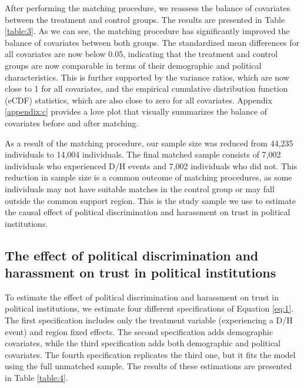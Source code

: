 \documentclass{article}
\begin{document}
After performing the matching procedure, we reassess the balance of covariates between the treatment and control groups. The results are presented in Table \ref{table:3}. As we can see, the matching procedure has significantly improved the balance of covariates between both groups. The standardized mean differences for all covariates are now below 0.05, indicating that the treatment and control groups are now comparable in terms of their demographic and political characteristics. This is further supported by the variance ratios, which are now close to 1 for all covariates, and the empirical cumulative distribution function (eCDF) statistics, which are also close to zero for all covariates. Appendix \ref{appendix:c} provides a love plot that visually summarizes the balance of covariates before and after matching.



As a result of the matching procedure, our sample size was reduced from 44,235 individuals to 14,004 individuals. The final matched sample consists of 7,002 individuals who experienced D/H events and 7,002 individuals who did not. This reduction in sample size is a common outcome of matching procedures, as some individuals may not have suitable matches in the control group or may fall outside the common support region. This is the study sample we use to estimate the causal effect of political discrimination and harassment on trust in political institutions.

\subsection{The effect of political discrimination and harassment on trust in political institutions}

To estimate the effect of political discrimination and harassment on trust in political institutions, we estimate four different specifications of Equation \ref{eq:1}. The first specification includes only the treatment variable (experiencing a D/H event) and region fixed effects. The second specification adds demographic covariates, while the third specification adds both demographic and political covariates. The fourth specification replicates the third one, but it fits the model using the full unmatched sample. The results of these estimations are presented in Table \ref{table:4}.


\end{document}
